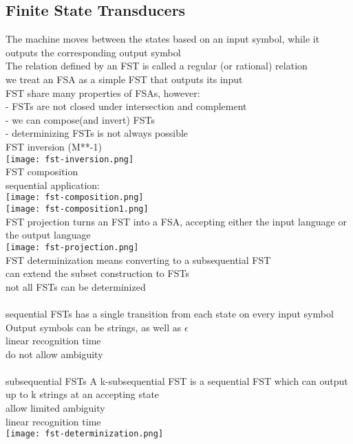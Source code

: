 \subsection*{Finite State Transducers}
{\tiny The machine moves between the states based on an input symbol, while it outputs the corresponding output symbol\\
The relation defined by an FST is called a regular (or rational) relation\\
we treat an FSA as a simple FST that outputs its input\\
FST share many properties of FSAs, however:\\
- FSTs are not closed under intersection and complement\\
- we can compose(and invert) FSTs\\
- determinizing FSTs is not always possible
}\\
\scriptsize{FST inversion (M**-1)}\\
\texttt{[image: fst-inversion.png]}\\
\scriptsize{FST composition}\\ {\tiny sequential application:\\ \texttt{[image: fst-composition.png]}\\
\texttt{[image: fst-composition1.png]}
}\\
\scriptsize{FST projection} {\tiny
turns an FST into a FSA, accepting either the input language or the output language\\
\texttt{[image: fst-projection.png]}
}\\
\scriptsize{FST determinization} {\tiny
means converting to a subsequential FST\\
can extend the subset construction to FSTs\\
not all FSTs can be determinized\\
}\\
\scriptsize{sequential FSTs} {\tiny
has a single transition from each state on every input symbol\\
Output symbols can be strings, as well as $\epsilon$\\
linear recognition time\\
do not allow ambiguity\\
}\\
\scriptsize{subsequential FSTs} {\tiny
A k-subsequential FST is a sequential FST which can output up to k strings at an accepting state\\
allow limited ambiguity\\
linear recognition time\\
\texttt{[image: fst-determinization.png]}
}\\